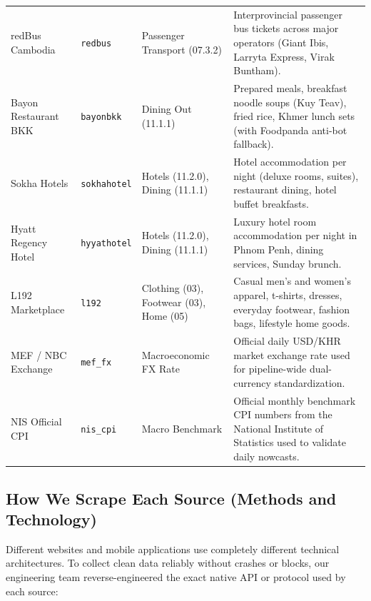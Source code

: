 \documentclass[11pt,a4paper,oneside]{article}
\begin{document}
\begin{longtable}{p{3.2cm}p{2.3cm}p{3.0cm}p{6.0cm}}
redBus Cambodia & \texttt{redbus} & Passenger Transport (07.3.2) & Interprovincial passenger bus tickets across major operators (Giant Ibis, Larryta Express, Virak Buntham). \\
Bayon Restaurant BKK & \texttt{bayonbkk} & Dining Out (11.1.1) & Prepared meals, breakfast noodle soups (Kuy Teav), fried rice, Khmer lunch sets (with Foodpanda anti-bot fallback). \\
Sokha Hotels & \texttt{sokhahotel} & Hotels (11.2.0), Dining (11.1.1) & Hotel accommodation per night (deluxe rooms, suites), restaurant dining, hotel buffet breakfasts. \\
Hyatt Regency Hotel & \texttt{hyyathotel} & Hotels (11.2.0), Dining (11.1.1) & Luxury hotel room accommodation per night in Phnom Penh, dining services, Sunday brunch. \\
L192 Marketplace & \texttt{l192} & Clothing (03), Footwear (03), Home (05) & Casual men's and women's apparel, t-shirts, dresses, everyday footwear, fashion bags, lifestyle home goods. \\
MEF / NBC Exchange & \texttt{mef\_fx} & Macroeconomic FX Rate & Official daily USD/KHR market exchange rate used for pipeline-wide dual-currency standardization. \\
NIS Official CPI & \texttt{nis\_cpi} & Macro Benchmark & Official monthly benchmark CPI numbers from the National Institute of Statistics used to validate daily nowcasts. \\
\bottomrule
\end{longtable}

\subsection{How We Scrape Each Source (Methods and Technology)}
Different websites and mobile applications use completely different technical architectures. To collect clean data reliably without crashes or blocks, our engineering team reverse-engineered the exact native API or protocol used by each source:
\end{document}
